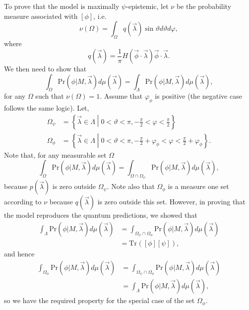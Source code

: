 \documentclass[DIV=calc,paper=a4,fontsize=11pt,twocolumn]{scrartcl} %
\theoremstyle{definition}
\theoremstyle{plain}
\newcommand{\Proj}[1]{\ensuremath{\left [ #1 \right ]}}
\newcommand{\Tr}[2][]{\ensuremath{\text{Tr}_{#1} \left ( #2 \right )}}
\begin{document}
To prove that the model is maximally $\psi$-epistemic, let $\nu$ be
the probability measure associated with $\Proj{\phi}$, i.e.
\begin{equation}
\nu(\Omega) = \int_{\Omega} q(\vec{\lambda}) \sin \vartheta
d\vartheta d\varphi,
\end{equation}
where
\begin{equation}
q(\vec{\lambda}) = \frac{1}{\pi} H \left ( \vec{\phi} \cdot
\vec{\lambda} \right ) \vec{\phi} \cdot \vec{\lambda}.
\end{equation}
We then need to show that
\begin{equation}
\int_{\Omega} \text{Pr}(\phi|M,\vec{\lambda}) d\mu(\vec{\lambda}) =
\int_{\Lambda} \text{Pr}(\phi|M,\vec{\lambda}) d\mu(\vec{\lambda}),
\end{equation}
for any $\Omega$ such that $\nu(\Omega) = 1$.  Assume that
$\varphi_{\phi}$ is positive (the negative case follows the same
logic).  Let,
\begin{align}
\Omega_{\psi} & = \left \{ \vec{\lambda} \in \Lambda \middle | 0<
\vartheta < \pi, - \frac{\pi}{2} < \varphi <
\frac{\pi}{2} \right \} \\
\Omega_{\phi} & = \left \{ \vec{\lambda} \in \Lambda \middle | 0<
\vartheta < \pi, -\frac{\pi}{2} + \varphi_{\phi} < \varphi <
\frac{\pi}{2} + \varphi_{\phi} \right \}.
\end{align}
Note that, for any measurable set $\Omega$
\begin{equation}
\int_{\Omega} \text{Pr}(\phi|M,\vec{\lambda}) d\mu(\vec{\lambda})=
\int_{\Omega \cap \Omega_{\psi}} \text{Pr}(\phi|M,\vec{\lambda})
d\mu(\vec{\lambda}),
\end{equation}
because $p(\vec{\lambda})$ is zero outside $\Omega_{\psi}$.  Note also
that $\Omega_{\phi}$ is a measure one set according to $\nu$ because
$q(\vec{\lambda})$ is zero outside this set.  However, in proving that
the model reproduces the quantum predictions, we showed that
\begin{align}
\int_{\Lambda} \text{Pr}(\phi|M,\vec{\lambda}) d\mu(\vec{\lambda}) &=
\int_{\Omega_{\psi} \cap \Omega_{\phi}} \text{Pr}(\phi|M,\vec{\lambda})
d\mu(\vec{\lambda}) \\
&= \Tr{\Proj{\phi}\Proj{\psi}},
\end{align}
and hence
\begin{align}
\int_{\Omega_{\phi}} \text{Pr}(\phi|M,\vec{\lambda}) d\mu(\vec{\lambda})
&= \int_{\Omega_{\psi} \cap \Omega_{\phi}}
\text{Pr}(\phi|M,\vec{\lambda}) d\mu(\vec{\lambda}) \\
&= \int_{\Lambda}
\text{Pr}(\phi|M,\vec{\lambda}) d\mu(\vec{\lambda}),
\end{align}
so we have the required property for the special case of the set
$\Omega_{\phi}$.
\end{document}
